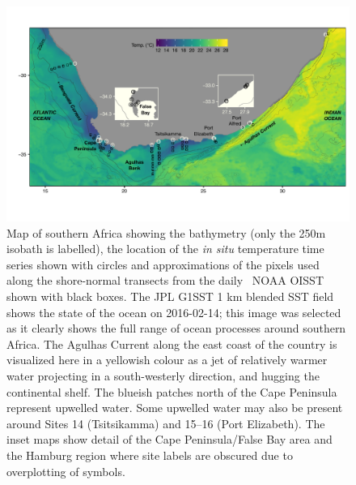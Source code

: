 \documentclass[a4paper,10pt,review]{elsarticle}
\begin{document}
\begin{figure}
\includegraphics[width=1.0\textwidth]{figure1_1km_inset_map_labeled.pdf}
\caption{Map of southern Africa showing the bathymetry (only the 250m isobath is labelled), the location of the \emph{in situ} temperature time series shown with circles and approximations of the pixels used along the shore-normal transects from the daily \degree~NOAA OISST \citep{Reynolds2007} shown with black boxes. The JPL G1SST 1 km blended SST field shows the state of the ocean on 2016-02-14; this image was selected as it clearly shows the full range of ocean processes around southern Africa. The Agulhas Current along the east coast of the country is visualized here in a yellowish colour as a jet of relatively warmer water projecting in a south-westerly direction, and hugging the continental shelf. The blueish patches north of the Cape Peninsula represent upwelled water. Some upwelled water may also be present around Sites 14 (Tsitsikamma) and 15--16 (Port Elizabeth). The inset maps show detail of the Cape Peninsula/False Bay area and the Hamburg region where site labels are obscured due to overplotting of symbols.}
\label{fig:Figure1}
\end{figure}
\end{document}
